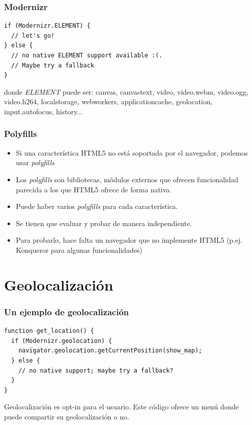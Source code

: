 
\begin{frame}[fragile]
\frametitle{Modernizr}

\begin{verbatim}
if (Modernizr.ELEMENT) {
  // let's go!
} else {
  // no native ELEMENT support available :(. 
  // Maybe try a fallback
}
\end{verbatim}

donde \emph{ELEMENT} puede ser: canvas, canvastext, video, video.webm, video.ogg, video.h264, localstorage, webworkers, applicationcache, geolocation, input.autofocus, history...

\end{frame}



\begin{frame}
\frametitle{Polyfills}

\begin{itemize}
  \item Si una característica HTML5 no está soportada por el navegador, podemos
  usar \emph{polyfills}
  \item Los \emph{polyfills} son bibliotecas, módulos externos que ofrecen funcionalidad
  parecida a los que HTML5 ofrece de forma nativa.
  \item Puede haber varios \emph{polyfills} para cada característica.
  \item Se tienen que evaluar y probar de manera independiente.
  \item Para probarlo, hace falta un navegador que no implemente HTML5 (p.ej. Konqueror para algunas funcionalidades)
\end{itemize}

\end{frame}


\section{Geolocalización}



\begin{frame}[fragile]
\frametitle{Un ejemplo de geolocalización}

\begin{verbatim}
function get_location() {
  if (Modernizr.geolocation) {
    navigator.geolocation.getCurrentPosition(show_map);
  } else {
    // no native support; maybe try a fallback?
  }
}
\end{verbatim}

Geolocalización es opt-in para el usuario. Este código ofrece un menú donde
puede compartir su geolocalización o no.

\end{frame}

